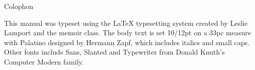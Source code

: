 \documentclass[10pt,a4paper,extrafontsizes]{memoir}
\begin{document}

\printindex



\cleardoublepage
\pagestyle{empty}
\null\vfil

\begin{adjustwidth}{1in}{1in}
\begin{center}
{\Large\textsf{Colophon}}
\end{center}
\begin{center}
This manual was typeset using the LaTeX typesetting system
created by Leslie Lamport and the memoir class. 
The body text is set 10/12pt on a
33pc measure with Palatino designed by Hermann Zapf, which includes 
italics and small caps. Other fonts include
Sans, Slanted and Typewriter from Donald Knuth's 
Computer Modern family.

\end{center}

\end{adjustwidth}

\vfil
\end{document}
